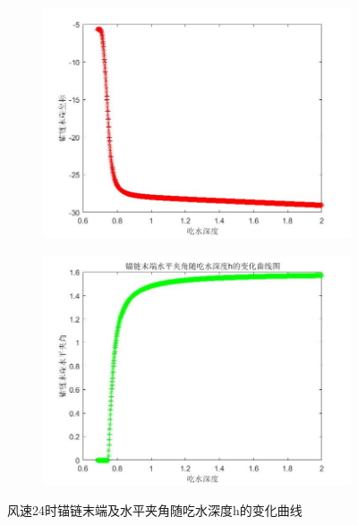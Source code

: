 \documentclass[UTF8]{ctexbook}
\theoremstyle{nonumberplain}
\begin{document}
            \begin{figure}[H]
                \centering
                \begin{subfigure}[b]{0.4\textwidth}
                    \includegraphics[width=\textwidth]{images/v_wind_24_yn_h.jpg}
                \end{subfigure}
                \begin{subfigure}[b]{0.4\textwidth}
                    \includegraphics[width=\textwidth]{images/v_wind_24_alpha_h.jpg}
                \end{subfigure}
                \caption{风速24时锚链末端及水平夹角随吃水深度h的变化曲线}
                \label{风速24时锚链末端及水平夹角随吃水深度h的变化曲线}
            \end{figure}
\end{document}
